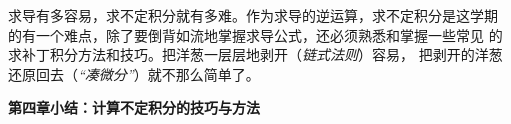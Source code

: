 求导有多容易，求不定积分就有多难。作为求导的逆运算，求不定积分是这学期
的有一个难点，除了要倒背如流地掌握求导公式，还必须熟悉和掌握一些常见
的求补丁积分方法和技巧。把洋葱一层层地剥开（{\it 链式法则}）容易，
把剥开的洋葱还原回去（{\it “凑微分”}）就不那么简单了。

% 
% 
% 
% 

\newpage

\begin{center}
	\Large\bf 第四章小结：计算不定积分的技巧与方法
\end{center}

